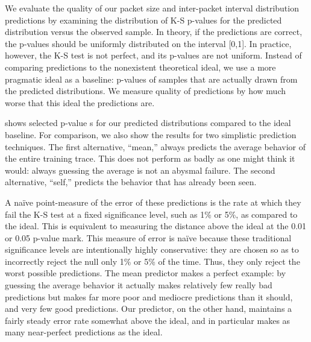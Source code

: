 \documentclass{acm_proc_article-sp}
\begin{document}

We evaluate the quality of our packet size and inter-packet interval distribution predictions by examining the distribution of K-S p-values for the predicted distribution versus the observed sample.
In theory, if the predictions are correct, the p-values should be uniformly distributed on the interval [0,1].
In practice, however, the K-S test is not perfect, and its p-values are not uniform.
Instead of comparing predictions to the nonexistent theoretical ideal, we use a more pragmatic ideal as a baseline:
p-values of samples that are actually drawn from the predicted distributions.
We measure quality of predictions by how much worse that this ideal the predictions are.\ksidealnote

 shows selected p-value s for our predicted distributions compared to the ideal baseline.
For comparison, we also show the results for two simplistic prediction techniques.
The first alternative, ``mean,'' always predicts the average behavior of the entire training trace.
This does not perform as badly as one might think it would:
always guessing the average is not an abysmal failure.
The second alternative, ``self,'' predicts the behavior that has already been seen.

A na\"ive point-measure of the error of these predictions is the rate at which they fail the K-S test at a fixed significance level, such as 1\% or 5\%, as compared to the ideal.
This is equivalent to measuring the distance above the ideal  at the 0.01 or 0.05 p-value mark.
This measure of error is na\"ive because these traditional significance levels are intentionally highly conservative:
they are chosen so as to incorrectly reject the null only 1\% or 5\% of the time.
Thus, they only reject the worst possible predictions.
The mean predictor makes a perfect example:
by guessing the average behavior it actually makes relatively few really bad predictions but makes far more poor and mediocre predictions than it should, and very few good predictions.
Our predictor, on the other hand, maintains a fairly steady error rate somewhat above the ideal, and in particular makes as many near-perfect predictions as the ideal.
\end{document}

